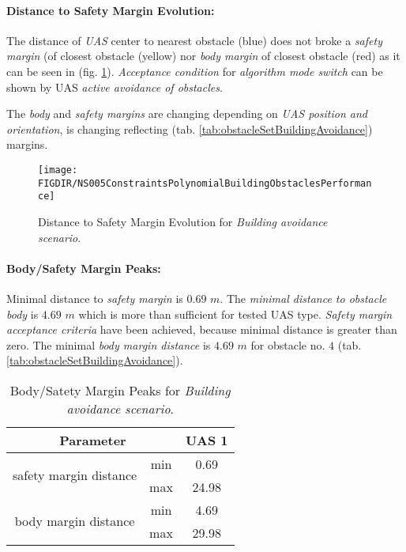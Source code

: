 \noindent\paragraph{Distance to Safety Margin Evolution:} The distance of \emph{UAS} center to nearest obstacle (blue) does not broke a \emph{safety margin} (of closest obstacle (yellow)  nor \emph{body margin} of closest obstacle (red) as it can be seen in (fig. \ref{fig:testCaseBuildingAvoidancePerformance}). \emph{Acceptance condition} for \emph{algorithm mode switch} can be shown by UAS \emph{active avoidance of obstacles}.

\begin{note}
The \emph{body} and \emph{safety margins} are changing depending on \emph{UAS position and orientation}, is changing reflecting (tab. \ref{tab:obstacleSetBuildingAvoidance}) margins. 
\end{note}


\begin{figure}[H]
	\centering
	\texttt{[image: \\FIGDIR/NS005ConstraintsPolynomialBuildingObstaclesPerformance]} 
	\caption{Distance to Safety Margin Evolution for \emph{Building avoidance scenario}.}
	\label{fig:testCaseBuildingAvoidancePerformance}
\end{figure}


\noindent\paragraph{Body/Safety Margin Peaks:} Minimal distance to \emph{safety margin} is $0.69$ $m$. The \emph{minimal distance to obstacle body} is $4.69$ $m$ which is more than sufficient for tested UAS type. \emph{Safety margin acceptance criteria} have been achieved, because minimal distance is greater than zero. The minimal \emph{body margin distance} is $4.69$ $m$ for obstacle no. $4$ (tab. \ref{tab:obstacleSetBuildingAvoidance}).

\begin{table}[H]
	\centering
	\begin{tabular}{c|c||c}
	\multicolumn{2}{c||}{Parameter} & UAS 1 \\\hline\hline
	\multirow{2}{*}{safety margin distance} & min & 0.69  \\\cline{2-3}
											& max & 24.98 \\\hline
	\multirow{2}{*}{body margin distance}   & min & 4.69  \\\cline{2-3}
											& max & 29.98 
	\end{tabular}
	\caption{Body/Satety Margin Peaks for \emph{Building avoidance scenario}.}
	\label{tab:testCaseBuildingAvoidanceSafetyAndBodyMarginDistances}
\end{table}

